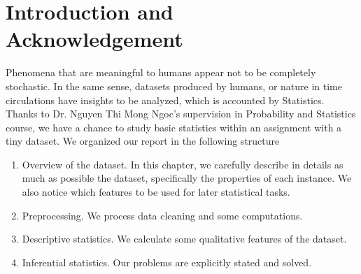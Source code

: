 \chapter*{Introduction and Acknowledgement}

Phenomena that are meaningful to humans appear not to be completely stochastic. In the same sense, datasets produced by humans, or nature in time circulations have insights to be analyzed, which is accounted by Statistics. Thanks to Dr. Nguyen Thi Mong Ngoc's supervision in Probability and Statistics course, we have a chance to study basic statistics within an assignment with a tiny dataset. We organized our report in the following structure

\begin{enumerate}
  \item Overview of the dataset. In this chapter, we carefully describe in details as much as possible the dataset, specifically the properties of each instance. We also notice which features to be used for later statistical tasks.
  \item Preprocessing. We process data cleaning and some computations.
  \item Descriptive statistics. We calculate some qualitative features of the dataset.
  \item Inferential statistics. Our problems are explicitly stated and solved.
\end{enumerate}